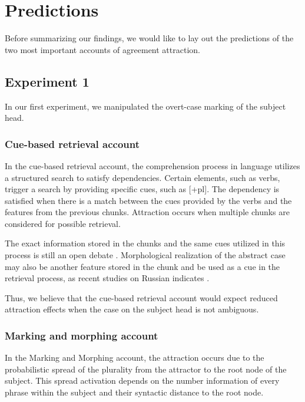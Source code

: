 \section{Predictions} \label{ch6predictions}

Before summarizing our findings, we would like to lay out the predictions of the two most important accounts of agreement attraction.

\subsection{Experiment 1}
In our first experiment, we manipulated the overt-case marking of the subject head. 

\subsubsection{Cue-based retrieval account}

In the cue-based retrieval account, the comprehension process in language utilizes a structured search to satisfy dependencies. Certain elements, such as verbs, trigger a search by providing specific cues, such as [+{pl}]. The dependency is satisfied when there is a match between the cues provided by the verbs and the features from the previous chunks. Attraction occurs when multiple chunks are considered for possible retrieval. 

The exact information stored in the chunks and the same cues utilized in this process is still an open debate \citep{ArnettWagers:2017}. Morphological realization of the abstract case may also be another feature stored in the chunk and be used as a cue in the retrieval process, as recent studies on Russian indicates \citep{SlioussarMalko2016, Slioussar2018}.

Thus, we believe that the cue-based retrieval account would expect reduced attraction effects when the case on the subject head is not ambiguous. 

\subsubsection{Marking and morphing account}

In the Marking and Morphing account, the attraction occurs due to the probabilistic spread of the plurality from the attractor to the root node of the subject. This spread activation depends on the number information of every phrase within the subject and their syntactic distance to the root node. 


